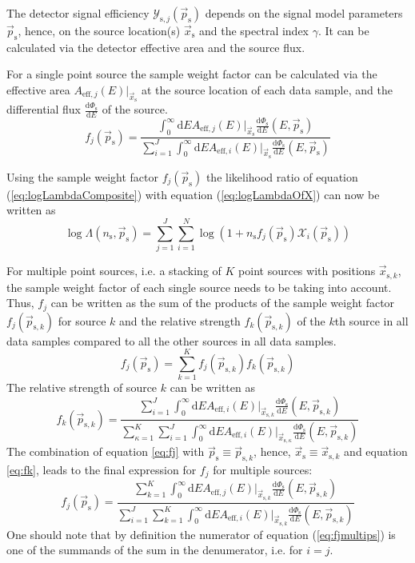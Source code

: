 \documentclass{article}
\newcommand{\eq}[1]{(\ref{#1})}
\newcommand{\ns}{n_{\mathrm{s}}}
\newcommand{\ps}{\vec{p}_{\mathrm{s}}}
\newcommand{\xs}{\vec{x}_{\mathrm{s}}}
\newcommand{\dPhisdE}{\frac{\mathrm{d}\Phi_{\mathrm{s}}}{\mathrm{d}E}}
\begin{document}
The detector signal efficiency $\mathcal{Y}_{\mathrm{s},j}(\ps)$
depends on the signal model parameters $\ps$, hence, on the source location(s) $\xs$
and the spectral index $\gamma$. It can be calculated via the detector effective
area and the source flux.

For a single point source the sample weight factor can be calculated via the effective area
$A_{\mathrm{eff},j}(E)|_{\xs}$ at the source location of each data sample, and the
differential flux $\dPhisdE$ of the source.
\begin{equation}
 f_{j}(\ps) = \frac{\int_0^\infty \mathrm{d}E A_{\mathrm{eff},j}(E)|_{\xs} \dPhisdE(E,\ps)}
	           {\sum_{i=1}^{J} \int_0^\infty \mathrm{d}E A_{\mathrm{eff},i}(E)|_{\xs} \dPhisdE(E,\ps)}
 \label{eq:fj}
\end{equation}

Using the sample weight factor $f_{j}(\ps)$ the likelihood ratio of
equation \eq{eq:logLambdaComposite} with equation \eq{eq:logLambdaOfX} can now
be written as
\begin{equation}
 \log \Lambda(\ns,\ps) = \sum_{j=1}^{J} \sum_{i=1}^{N} \log (1 + \ns f_{j}(\ps)\mathcal{X}_i(\ps))
\end{equation}


For multiple point sources, i.e. a stacking of $K$ point sources with positions
$\vec{x}_{\mathrm{s},k}$, the sample weight factor of each single source needs
to be taking into account. Thus, $f_{j}$ can be written as the sum of the
products of the sample weight factor $f_{j}(\vec{p}_{\mathrm{s},k})$ for
source $k$ and the relative strength $f_{k}(\vec{p}_{\mathrm{s},k})$ of the
$k$th source in all data samples compared to all the other sources in all data
samples.
\begin{equation}
 f_{j}(\ps) = \sum_{k=1}^{K} f_{j}(\vec{p}_{\mathrm{s},k}) f_{k}(\vec{p}_{\mathrm{s},k})
\end{equation}
The relative strength of source $k$ can be written as
\begin{equation}
 f_{k}(\vec{p}_{\mathrm{s},k}) =
    \frac{\sum_{i=1}^{J} \int_0^\infty \mathrm{d}E A_{\mathrm{eff},i}(E)|_{\vec{x}_{\mathrm{s},k}} \dPhisdE(E,\vec{p}_{\mathrm{s},k})}
         {\sum_{\kappa=1}^{K} \sum_{i=1}^{J} \int_0^\infty \mathrm{d}E A_{\mathrm{eff},i}(E)|_{\vec{x}_{\mathrm{s},\kappa}} \dPhisdE(E,\vec{p}_{\mathrm{s},k}) }
 \label{eq:fk}
\end{equation}
The combination of equation \ref{eq:fj} with $\ps \equiv \vec{p}_{\mathrm{s},k}$, hence,
$\xs \equiv \vec{x}_{\mathrm{s},k}$ and equation
\ref{eq:fk}, leads to the final expression for $f_{j}$ for multiple sources:
\begin{equation}
 f_{j}(\ps) =
    \frac{\sum_{k=1}^{K} \int_0^\infty \mathrm{d}E A_{\mathrm{eff},j}(E)|_{\vec{x}_{\mathrm{s},k}} \dPhisdE(E,\vec{p}_{\mathrm{s},k}) }
         {\sum_{i=1}^{J} \sum_{k=1}^{K} \int_0^\infty \mathrm{d}E A_{\mathrm{eff},i}(E)|_{\vec{x}_{\mathrm{s},k}} \dPhisdE(E,\vec{p}_{\mathrm{s},k}) }
 \label{eq:fjmultips}
\end{equation}
One should note that by definition the numerator of equation \eq{eq:fjmultips}
is one of the summands of the sum in the denumerator, i.e. for $i=j$.
\end{document}
